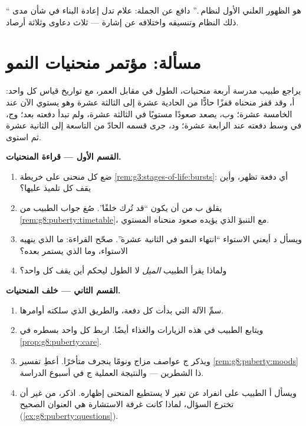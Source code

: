\begin{exercise}[$\star\star\star$]\label{exo:g8:puberty:12}
`` هو الظهور العلني الأول لنظام .'' دافع عن الجملة:
علام تدل إعادة البناء في شأن مدى ذلك النظام وتنسيقه واختلافه عن
إشارة  --- ثلاث دعاوى وثلاثة أرصاد.
\end{exercise}

\section{مسألة: مؤتمر منحنيات النمو}

\begin{problem}\label{pb:g8:puberty:1}
يراجع طبيب مدرسة أربعة منحنيات، الطول في مقابل العمر، مع تواريخ
قياس كل واحد: أ، وقد قفز منحناه قفزًا حادًّا من الحادية عشرة إلى
الثالثة عشرة وهو يستوي الآن عند الخامسة عشرة؛ وب، يصعد صعودًا
مستويًا في الثالثة عشرة، ولم تبدأ دفعته بعد؛ وج، في وسط دفعته عند
الرابعة عشرة؛ ود، جرى قسمه الحادّ من التاسعة إلى الثانية عشرة ثم
استوى.

\medskip\noindent\textbf{القسم الأول --- قراءة المنحنيات.}
\begin{enumerate}
  \item ضع كل منحنى على خريطة
        \cref{rem:g3:stages-of-life:bursts}: أي دفعة تظهر، وأين
        يقف كل تلميذ عليها؟
  \item يقلق ب من أن يكون ``قد تُرك خلفًا''. صُغ جواب الطبيب من
        \cref{rem:g8:puberty:timetable}، مع التنبؤ الذي يؤيده
        صعود منحناه المستوي.
  \item ويسأل د أيعني الاستواء ``انتهاء النمو في الثانية عشرة''.
        صحّح القراءة: ما الذي ينهيه الاستواء، وما الذي يستمر
        بعده؟
  \item ولماذا يقرأ الطبيب \emph{الميل} لا الطول ليحكم أين يقف
        كل واحد؟
\end{enumerate}

\medskip\noindent\textbf{القسم الثاني --- خلف المنحنيات.}
\begin{enumerate}[resume]
  \item سمِّ الآلة التي بدأت كل دفعة، والطريق الذي سلكته أوامرها.
  \item ويتابع الطبيب في هذه الزيارات  والغذاء أيضًا. اربط
        كل واحد بسطره في \cref{prop:g8:puberty:care}.
  \item ويذكر ج عواصف مزاج ونومًا ينجرف متأخرًا. أعطِ تفسير
        \cref{rem:g8:puberty:moods} ذا الشطرين --- والنتيجة
        العملية  ج في أسبوع الدراسة.
  \item ويسأل أ الطبيب على انفراد عن تغير لا يستطيع المنحنى
        إظهاره. اذكر، من غير أن تخترع السؤال، لماذا كانت غرفة
        الاستشارة هي العنوان الصحيح
        (\cref{ex:g8:puberty:questions}).
\end{enumerate}


\end{problem}
